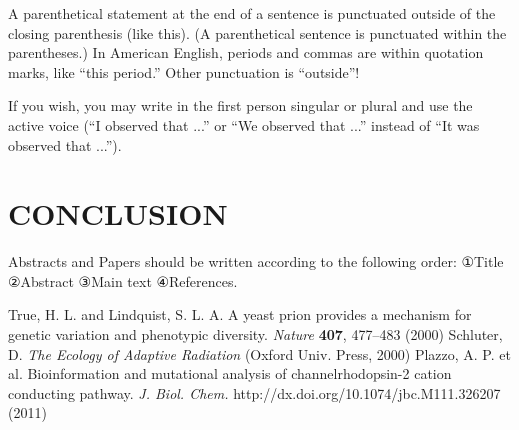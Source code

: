 \documentclass{fullpaper_hutech_v1.02}
\begin{document}
A parenthetical statement at the end of a sentence is punctuated outside of the closing parenthesis (like this). (A parenthetical sentence is punctuated within the parentheses.) In American English, periods and commas are within quotation marks, like ``this period.'' Other punctuation is ``outside''!

If you wish, you may write in the first person singular or plural and use the active voice (``I observed that ...'' or ``We observed that ...'' instead of ``It was observed that ...'').

\section{CONCLUSION}

Abstracts and Papers should be written according to the following order: ①Title ②Abstract ③Main text ④References.

\begin{thebibliography}{99}
 True, H. L. and Lindquist, S. L. A. A yeast prion provides a mechanism for genetic variation and phenotypic diversity. {\it Nature} {\bf 407}, 477--483 (2000)
 Schluter, D. {\it The Ecology of Adaptive Radiation} (Oxford Univ. Press, 2000)
 Plazzo, A. P. et al. Bioinformation and mutational analysis of channelrhodopsin-2 cation conducting pathway. {\it J. Biol. Chem.} http://dx.doi.org/10.1074/jbc.M111.326207 (2011)
\end{thebibliography}
\end{document}
